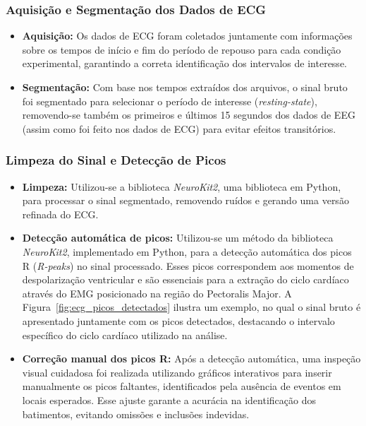 \subsubsection{Aquisição e Segmentação dos Dados de ECG}
\begin{itemize}
    \item \textbf{Aquisição:} Os dados de ECG foram coletados juntamente com informações sobre os tempos de início e fim do período de repouso para cada condição experimental, garantindo a correta identificação dos intervalos de interesse.
    \item \textbf{Segmentação:} Com base nos tempos extraídos dos arquivos, o sinal bruto foi segmentado para selecionar o período de interesse (\textit{resting-state}), removendo-se também os primeiros e últimos 15 segundos dos dados de EEG (assim como foi feito nos dados de ECG) para evitar efeitos transitórios.
\end{itemize}

\subsubsection{Limpeza do Sinal e Detecção de Picos}
\begin{itemize}
    \item \textbf{Limpeza:} Utilizou-se a biblioteca \textit{NeuroKit2}, uma biblioteca em Python, para processar o sinal segmentado, removendo ruídos e gerando uma versão refinada do ECG.
    \item \textbf{Detecção automática de picos:} Utilizou-se um método da biblioteca \textit{NeuroKit2}, implementado em Python, para a detecção automática dos picos R (\textit{R-peaks}) no sinal processado. Esses picos correspondem aos momentos de despolarização ventricular e são essenciais para a extração do ciclo cardíaco através do EMG posicionado na região do Pectoralis Major. A Figura~\ref{fig:ecg_picos_detectados} ilustra um exemplo, no qual o sinal bruto é apresentado juntamente com os picos detectados, destacando o intervalo específico do ciclo cardíaco utilizado na análise.
    \item \textbf{Correção manual dos picos R:} Após a detecção automática, uma inspeção visual cuidadosa foi realizada utilizando gráficos interativos para inserir manualmente os picos faltantes, identificados pela ausência de eventos em locais esperados. Esse ajuste garante a acurácia na identificação dos batimentos, evitando omissões e inclusões indevidas.
\end{itemize}

